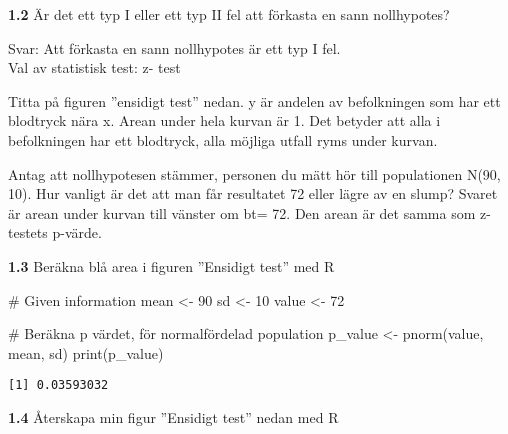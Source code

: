 \documentclass[
  letterpaper,
  DIV=11,
  numbers=noendperiod]{scrartcl}
\newenvironment{Shaded}{\begin{snugshade}}{\end{snugshade}}
\newcommand{\CommentTok}[1]{\textcolor[rgb]{0.37,0.37,0.37}{#1}}
\newcommand{\DecValTok}[1]{\textcolor[rgb]{0.68,0.00,0.00}{#1}}
\newcommand{\FunctionTok}[1]{\textcolor[rgb]{0.28,0.35,0.67}{#1}}
\newcommand{\NormalTok}[1]{\textcolor[rgb]{0.00,0.23,0.31}{#1}}
\newcommand{\OtherTok}[1]{\textcolor[rgb]{0.00,0.23,0.31}{#1}}
\begin{document}
\textbf{1.2} Är det ett typ I eller ett typ II fel att förkasta en sann
nollhypotes?

\hfill\break
Svar: Att förkasta en sann nollhypotes är ett typ I fel.\\

Val av statistisk test: z- test

Titta på figuren ''ensidigt test'' nedan. y är andelen av befolkningen
som har ett blodtryck nära x. Arean under hela kurvan är 1. Det betyder
att alla i befolkningen har ett blodtryck, alla möjliga utfall ryms
under kurvan.

Antag att nollhypotesen stämmer, personen du mätt hör till populationen
N(90, 10). Hur vanligt är det att man får resultatet 72 eller lägre av
en slump? Svaret är arean under kurvan till vänster om bt= 72. Den arean
är det samma som z-testets p-värde.

\textbf{1.3} Beräkna blå area i figuren ''Ensidigt test'' med R

\begin{Shaded}
\begin{Highlighting}[]
\CommentTok{\# Given information}
\NormalTok{mean }\OtherTok{\textless{}{-}} \DecValTok{90}
\NormalTok{sd }\OtherTok{\textless{}{-}} \DecValTok{10}
\NormalTok{value }\OtherTok{\textless{}{-}} \DecValTok{72}

\CommentTok{\# Beräkna p värdet, för normalfördelad population}
\NormalTok{p\_value }\OtherTok{\textless{}{-}} \FunctionTok{pnorm}\NormalTok{(value, mean, sd)}
\FunctionTok{print}\NormalTok{(p\_value)}
\end{Highlighting}
\end{Shaded}

\begin{verbatim}
[1] 0.03593032
\end{verbatim}

\textbf{1.4} Återskapa min figur ''Ensidigt test'' nedan med R
\end{document}
